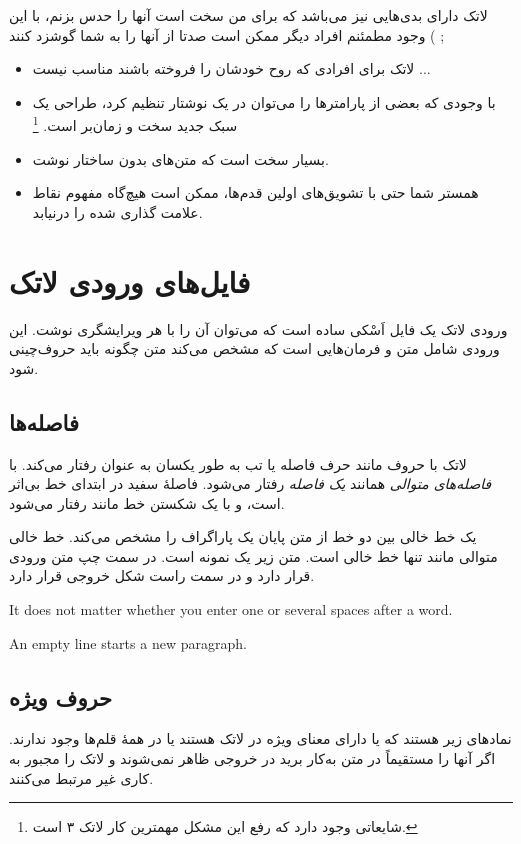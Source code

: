 \noindent
 لاتک دارای بدی‌هایی نیز می‌باشد که برای من سخت است آنها را حدس بزنم، با این وجود مطمئنم افراد دیگر ممکن است صدتا از آنها را به شما گوشزد کنند  (
\lr{-};
\begin{itemize}
\item 
لاتک برای افرادی که روح خودشان را فروخته باشند مناسب نیست  ...

\item 

با وجودی که بعضی از پارامترها را می‌‌توان در یک نوشتار تنظیم کرد، طراحی یک سبک‌ جدید سخت  و زمان‌بر است.%
\footnote{شایعاتی وجود دارد که رفع این مشکل مهمترین کار لاتک ۳ است.}
\item 
بسیار سخت است که متن‌های بدون ساختار نوشت.

\item 
همستر%
شما  حتی با تشویق‌های اولین قدم‌ها، ممکن است هیچ‌گاه مفهوم نقاط علامت گذاری‌ شده را درنیابد.

\end{itemize}
\section{فایل‌های ورودی لاتک}
ورودی لاتک یک فایل اَسْکی ساده است که می‌توان آن را با هر ویرایشگری نوشت. این ورودی شامل متن و فرمان‌هایی است که مشخص می‌کند متن چگونه باید حروف‌چینی شود.
\subsection{فاصله‌ها}
لاتک با حروف 
مانند حرف فاصله%
یا تب%
به طور یکسان به عنوان 
رفتار می‌کند. با {\it فاصله‌های متوالی} همانند {\it یک فاصله}
رفتار می‌شود. فاصلهٔ سفید در ابتدای خط بی‌اثر است، و با یک شکستن خط مانند  
رفتار می‌شود.

یک خط خالی بین دو خط از متن پایان یک پاراگراف را مشخص می‌کند.  خط خالی متوالی مانند تنها 
خط خالی است. متن زیر یک نمونه است. در سمت چپ متن ورودی قرار دارد و در سمت راست شکل خروجی قرار دارد.


\begin{example}
It does not matter whether you
enter one or several     spaces
after a word.

An empty line starts a new 
paragraph.
\end{example}

\subsection{حروف ویژه}
نماد‌های زیر 
 هستند که یا دارای معنای ویژه در لاتک هستند یا در همهٔ قلم‌ها وجود ندارند. اگر آنها را مستقیماً در متن به‌کار برید در خروجی ظاهر نمی‌شوند و لاتک را مجبور به کاری 
غیر مرتبط می‌کنند.

